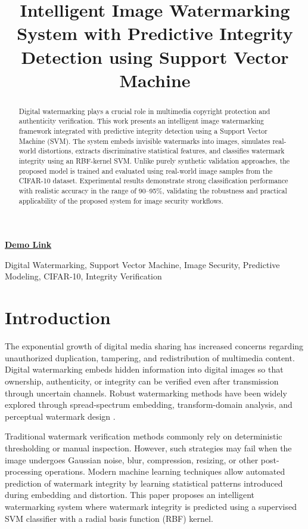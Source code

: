 \documentclass[conference]{IEEEtran}
\title{Intelligent Image Watermarking System with Predictive Integrity Detection using Support Vector Machine}
\author{
\IEEEauthorblockN{Divyam Kumar Choubey}
\IEEEauthorblockA{
Roll No: 23103070\\
Department of Computer Science and Engineering\\
National Institute of Technology, Manipur\\
Email: divyam@nitmanipur.ac.in}
}
\begin{document}
\maketitle

\begin{center}
\small \href{https://drive.google.com/file/d/1F8AcEe8bqd9cTBVpyr6GKzUrdJEtLbdv/view?usp=sharing}{\textbf{Demo Link}}
\end{center}

\begin{abstract}
Digital watermarking plays a crucial role in multimedia copyright protection and authenticity verification. This work presents an intelligent image watermarking framework integrated with predictive integrity detection using a Support Vector Machine (SVM). The system embeds invisible watermarks into images, simulates real-world distortions, extracts discriminative statistical features, and classifies watermark integrity using an RBF-kernel SVM. Unlike purely synthetic validation approaches, the proposed model is trained and evaluated using real-world image samples from the CIFAR-10 dataset. Experimental results demonstrate strong classification performance with realistic accuracy in the range of 90--95\%, validating the robustness and practical applicability of the proposed system for image security workflows.
\end{abstract}

\begin{IEEEkeywords}
Digital Watermarking, Support Vector Machine, Image Security, Predictive Modeling, CIFAR-10, Integrity Verification
\end{IEEEkeywords}

\section{Introduction}
The exponential growth of digital media sharing has increased concerns regarding unauthorized duplication, tampering, and redistribution of multimedia content. Digital watermarking embeds hidden information into digital images so that ownership, authenticity, or integrity can be verified even after transmission through uncertain channels. Robust watermarking methods have been widely explored through spread-spectrum embedding, transform-domain analysis, and perceptual watermark design \cite{cox1997secure,swanson1998multimedia,podilchuk1998image,barni1998dct}.

Traditional watermark verification methods commonly rely on deterministic thresholding or manual inspection. However, such strategies may fail when the image undergoes Gaussian noise, blur, compression, resizing, or other post-processing operations. Modern machine learning techniques allow automated prediction of watermark integrity by learning statistical patterns introduced during embedding and distortion. This paper proposes an intelligent watermarking system where watermark integrity is predicted using a supervised SVM classifier with a radial basis function (RBF) kernel.
\end{document}
